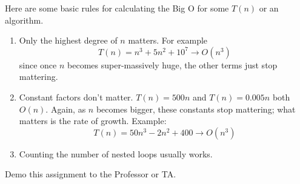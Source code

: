 \documentclass[letter,answers,addpoints]{exam}
\begin{document}
	\lstset{language=Java, basicstyle= \ttfamily\small,  showstringspaces=false} 
	\vspace*{0.15in}
	\vspace{0.25in}
	
	
	Here are some basic rules for calculating the Big O for some $T(n)$ or an algorithm.
	
	\begin{enumerate}
		\item Only the highest degree of $ n $ matters.  For example $$ T(n) =n^3 +5n^2 +10^7  \rightarrow O(n^3) $$ since once $ n $ becomes super-massively huge,  the other terms just stop mattering.
		\item Constant factors don't matter. $ T(n)  = 500n$ and  $ T(n)  = 0.005n$ both $O(n)$. Again, as $ n $ becomes bigger, these constants stop mattering; what matters is the rate of growth. Example: $$T(n) = 50n^3 - 2n^2 +400 \rightarrow O(n^3)$$
		\item  Counting the number of nested loops usually works.
	\end{enumerate}

	Demo this assignment to the Professor or TA.
	\newpage
	
\end{document}
